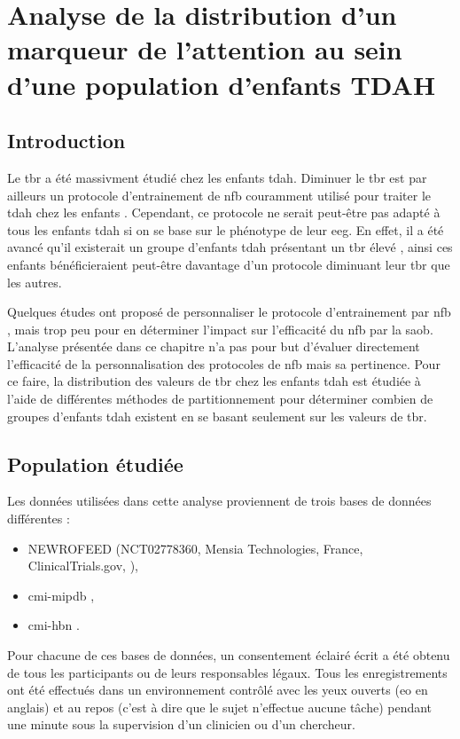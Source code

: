 \chapter{Analyse de la distribution d'un marqueur de l'attention au sein d'une population d'enfants TDAH}

\section*{Introduction}
Le \gls{tbr} a été massivment étudié chez les enfants \gls{tdah}. Diminuer le \gls{tbr} est par ailleurs un protocole d'entrainement de \gls{nfb} couramment utilisé 
pour traiter le \gls{tdah} chez les enfants \citep{Arnold2014, Deilami2016, Gevensleben2009, VanDongen2013}. Cependant, ce protocole ne serait peut-être pas adapté à tous les enfants \gls{tdah} si 
on se base sur le phénotype de leur \gls{eeg}. En effet, il a été avancé qu'il existerait un groupe d'enfants \gls{tdah} présentant un \gls{tbr} élevé 
\citep{Zhang2017, Clarke2011}, ainsi ces enfants bénéficieraient peut-être davantage d'un protocole diminuant leur \gls{tbr} que les autres. 

Quelques études ont proposé de personnaliser le protocole d'entrainement par \gls{nfb} \citep{Bazanova2018, Escolano2014}, mais trop peu pour en déterminer
l'impact sur l'efficacité du \gls{nfb} par la \gls{saob}. L'analyse présentée dans ce chapitre n'a pas pour but d'évaluer directement l'efficacité de la 
personnalisation des protocoles de \gls{nfb} mais sa pertinence. Pour ce faire, la distribution des valeurs de \gls{tbr} chez les enfants \gls{tdah} est 
étudiée à l'aide de différentes méthodes de partitionnement pour déterminer combien de groupes d'enfants \gls{tdah} existent en se basant seulement sur les 
valeurs de \gls{tbr}. 

\section{Population étudiée}

Les données utilisées dans cette analyse proviennent de trois bases de données différentes :
\begin{itemize}
\item NEWROFEED (NCT02778360, Mensia Technologies, France, ClinicalTrials.gov, \citet{Bioulac2019}),
\item \gls{cmi-mipdb} \citep{Langer2017, Langer2017b},
\item \gls{cmi-hbn} \citep{Alexander2017, Alexander2017b}.
\end{itemize}
Pour chacune de ces bases de données, un consentement éclairé écrit a été obtenu de tous les participants ou de leurs responsables légaux. Tous les enregistrements
ont été effectués dans un environnement contrôlé avec les yeux ouverts (\gls{eo} en anglais) et au repos (c'est à dire que le sujet n'effectue aucune tâche) 
pendant une minute sous la supervision d'un clinicien ou d'un chercheur. 

